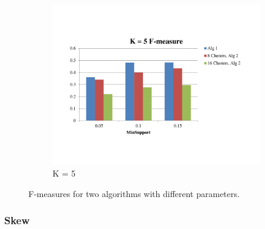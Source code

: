 \begin{figure}
\begin{subfigure}[b]{0.4\textwidth}
         \includegraphics[width=\textwidth]{F-measure5}
         \caption{K = 5}
         \label{Fig:F-measure5}
        \end{subfigure}
        \caption{F-measures for two algorithms with different parameters.}
        \label{Fig:F-measure}
\end{figure}

\subsubsection{Skew}
